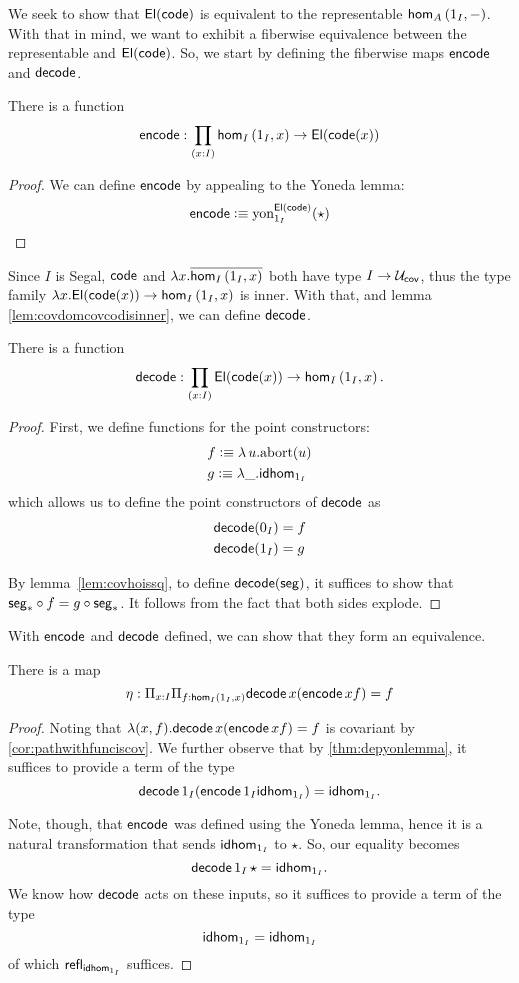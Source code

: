 \documentclass[main.tex]{subfiles}
\begin{document}
We seek to show that $\El(\co)$ is equivalent to the representable $\ho[A]{1_I}{-}$. With that in mind, we want to exhibit a fiberwise equivalence between the representable and $\El(\co)$. So, we start by defining the fiberwise maps $\eco$ and $\dco$.

\begin{lemma}
    There is a function $$\eco: \prod_{(x:I)} \ho[I]{1_I}{x} \to \El(\co(x))$$ 
\end{lemma}
\begin{proof}
    We can define $\eco$ by appealing to the Yoneda lemma:
    \begin{align*}
    \eco \defeq \text{yon}_{1_I}^{\El(\co)}(\star)
\end{align*}
\end{proof}


Since $I$ is Segal, $\co$ and $\lambda x. \overline{\ho[I]{1_I}{x}}$ both have type $I \to \uc$, thus the type family $\lambda x. \El(\co(x)) \to \ho[I]{1_I}{x}$ is inner. With that, and lemma \cref{lem:covdomcovcodisinner}, we can define $\dco$.
\begin{lemma}
    There is a function $$\dco : \prod_{(x:I)}\El(\co(x)) \to \ho[I]{1_I}{x}.$$
\end{lemma}
\begin{proof}
First, we define functions for the point constructors:
\begin{align*}
    &f \defeq \lambda\, u. \text{abort}(u)\\
    &g \defeq \lambda \_ . \idhom{1_I}
\end{align*}
which allows us to define the point constructors of $\dco$ as
\begin{align*}
    &\dco(0_I) = f\\
    &\dco(1_I) = g\\
\end{align*}

By lemma~\cref{lem:covhoissq}, to define $\dco(\seg)$, it suffices to show that $\seg_*\circ f = g \circ \seg_*$. 
It follows from the fact that both sides explode.
\end{proof}

With $\eco$ and $\dco$ defined, we can show that they form an equivalence.

\begin{lemma}
    There is a map 
    $$ \eta : \Pi_{x : I} \Pi_{f : \ho[I]{1_I}{x}} \normalfont \dco \, x (\eco \, x f) = f$$
\end{lemma}
\begin{proof}
Noting that $\lambda (x, f) .\dco \, x (\eco \, x f) = f$ is covariant by \cref{cor:pathwithfunciscov}. We further observe that by \cref{thm:depyonlemma}, it suffices to provide a term of the type
$$\dco \, 1_I (\eco \, 1_I \idhom{1_I}) = \idhom{1_I}.$$

Note, though, that $\eco$ was defined using the Yoneda lemma, hence it is a natural transformation that sends $\idhom{1_I}$ to $\star$. So, our equality becomes $$
\dco \, 1_I \, \star = \idhom{1_I}.$$ We know how $\dco$ acts on these inputs, so it suffices to provide a term of the type
$$\idhom{1_I} = \idhom{1_I}$$
of which $\refl{\idhom{1_I}}$ suffices.
\end{proof}
\end{document}
